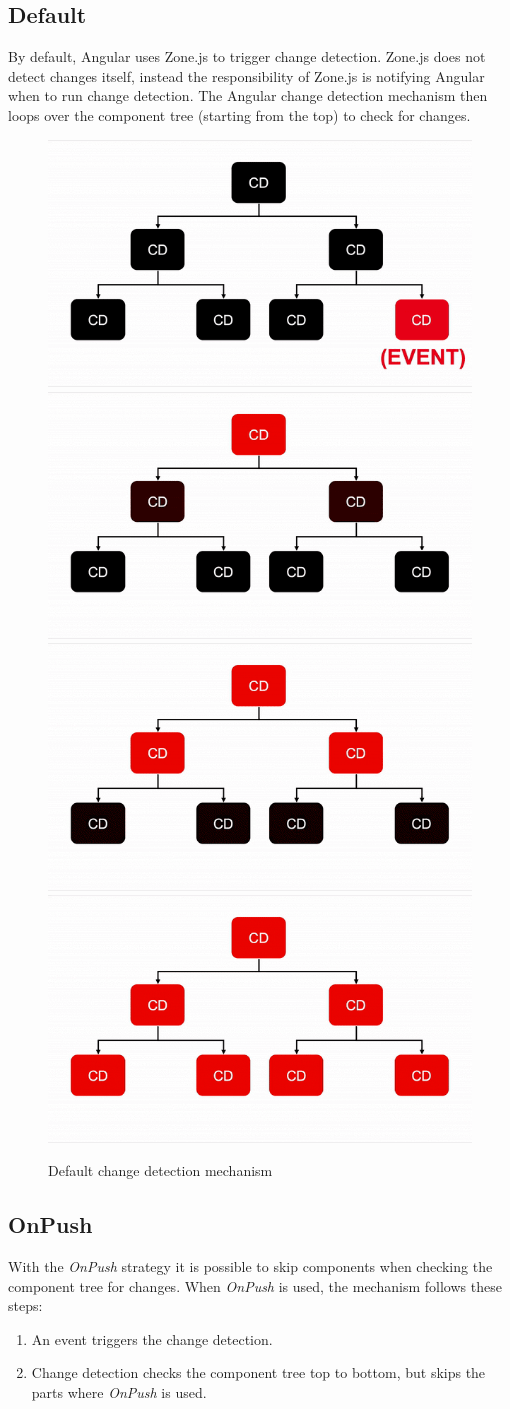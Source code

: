 \subsection{Default}
By default, Angular uses Zone.js to trigger change detection. Zone.js does not detect changes itself, instead the responsibility of Zone.js is notifying Angular when to run change detection. \autocite{Inatomi2020} The Angular change detection mechanism then loops over the component tree (starting from the top) to check for changes.
\begin{figure}[h!]
    \caption{Default change detection mechanism}
    \centering
    \includegraphics[width=.49\textwidth]{img/cycle1.png} 
    \includegraphics[width=.49\textwidth]{img/cycle2.png} 
    \includegraphics[width=.49\textwidth]{img/cycle3.png} 
    \includegraphics[width=.49\textwidth]{img/cycle4.png} 
\end{figure}

\subsection{OnPush}
With the \emph{OnPush} strategy it is possible to skip components when checking the component tree for changes. When \emph{OnPush} is used, the mechanism follows these steps:
\begin{enumerate}
    \item An event triggers the change detection.
    \item Change detection checks the component tree top to bottom, but skips the parts where \emph{OnPush} is used.
    \autocite{Hoffmann2019}
\end{enumerate}

